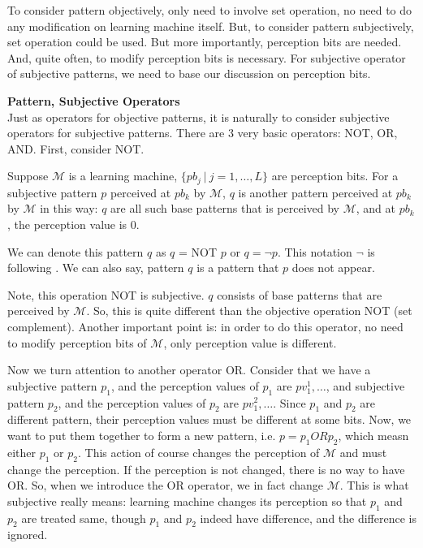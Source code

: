 To consider pattern objectively, only need to involve set operation, no need to do any modification on learning machine itself. But, to consider pattern subjectively, set operation could be used. But more importantly, perception bits are needed. And, quite often, to modify perception bits is necessary. For subjective operator of subjective patterns, we need to base our discussion on perception bits.
\bigskip




{\bf Pattern, Subjective Operators} \\
Just as operators for objective patterns, it is naturally to consider subjective operators for subjective patterns. There are 3 very basic operators: NOT, OR, AND. First, consider NOT.

\begin{definition}
Suppose $\mathcal{M}$ is a learning machine, $\{pb_j \ |\ j = 1, \ldots, L\}$ are perception bits. For a subjective pattern $p$ perceived at $pb_k$ by $\mathcal{M}$, $q$ is another pattern perceived at $pb_k$ by $\mathcal{M}$ in this way: $q$ are all such base patterns that is perceived by $\mathcal{M}$, and at $pb_k$, the perception value is 0. 
\end{definition}
We can denote this pattern $q$ as $q$ = NOT $p$ or $q = \neg p$. This notation $\neg$ is following \cite{mkrot}. We can also say, pattern $q$ is a pattern that $p$ does not appear. 

Note, this operation NOT is subjective. $q$ consists of base patterns that are perceived by $\mathcal{M}$. So, this is quite different than the objective operation NOT (set complement). Another important point is: in order to do this operator, no need to modify perception bits of $\mathcal{M}$, only perception value is different. 

Now we turn attention to another operator OR. Consider that we have a subjective pattern $p_1$, and the perception values of $p_1$ are $pv^1_1, \ldots$, and subjective pattern $p_2$, and the perception values of $p_2$ are  $pv^2_1, \ldots$. Since $p_1$ and $p_2$ are different pattern, their perception values must be different at some bits. Now, we want to put them together to form a new pattern, i.e. $p = p_1 OR p_2$, which measn either $p_1$ or $p_2$. This action of course changes the perception of $\mathcal{M}$ and must change the perception. If the perception is not changed, there is no way to have OR. So, when we introduce the OR operator, we in fact change $\mathcal{M}$. This is what subjective really means: learning machine changes its perception so that $p_1$ and $p_2$ are treated same, though $p_1$ and $p_2$ indeed have difference, and the difference is ignored. 


